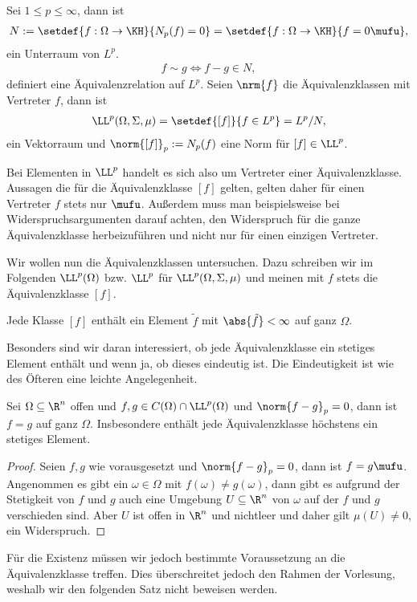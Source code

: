 \begin{defn}
\label{defn:3.69}
Sei $1\le p\le\infty$, dann ist
\begin{align*}
N := \setdef{f: \Omega\to\KH}{N_p(f) =0} = \setdef{f:\Omega\to\KH}{f=0\mufu},
\end{align*}
ein Unterraum von $L^p$.
\begin{align*}
f\sim g \Leftrightarrow f-g\in N,
\end{align*}
definiert eine Äquivalenzrelation auf $L^p$. Seien $\nrm{f}$ die
Äquivalenzklassen mit Vertreter $f$, dann ist
\begin{align*}
\LL^p(\Omega,\Sigma,\mu) = \setdef{[f]}{f\in L^p} = L^p/N,
\end{align*}
ein Vektorraum und $\norm{[f]}_p := N_p(f)$ eine Norm für
$[f]\in\LL^p$.\fishhere
\end{defn}

Bei Elementen in $\LL^p$ handelt es sich also um Vertreter einer
Äquivalenzklasse. Aussagen die für die Äquivalenzklasse $[f]$ gelten, gelten
daher für einen Vertreter $f$ stets nur $\mufu$. Außerdem muss man
beispielsweise bei Widerspruchsargumenten darauf achten, den Widerspruch für die ganze
Äquivalenzklasse herbeizuführen und nicht nur für einen einzigen Vertreter.

Wir wollen nun die Äquivalenzklassen untersuchen. Dazu schreiben wir im Folgenden $\LL^p(\Omega)$ bzw. $\LL^p$ für
$\LL^p(\Omega,\Sigma,\mu)$ und meinen mit $f$ stets die Äquivalenzklasse $[f]$.

\begin{bemn}
Jede Klasse $[f]$ enthält ein Element $\tilde{f}$ mit $\abs{\tilde{f}} <\infty$
auf ganz $\Omega$.\maphere
\end{bemn}
Besonders sind wir daran interessiert, ob jede Äquivalenzklasse ein
stetiges Element enthält und wenn ja, ob dieses eindeutig ist. Die
Eindeutigkeit ist wie des Öfteren eine leichte Angelegenheit.

\begin{prop}
\label{prop:3.70}
Sei $\Omega\subseteq\R^n$ offen und $f,g\in C(\Omega)\cap\LL^p(\Omega)$ und
$\norm{f-g}_p=0$, dann ist $f=g$ auf ganz $\Omega$. Insbesondere enthält jede
Äquivalenzklasse höchstens ein stetiges Element.\fishhere
\end{prop}

\begin{proof}
Seien $f,g$ wie vorausgesetzt und $\norm{f-g}_p=0$, dann ist $f=g\mufu$.
Angenommen es gibt ein $\omega\in\Omega$ mit $f(\omega) \neq g(\omega)$, dann
gibt es aufgrund der Stetigkeit von $f$ und $g$ auch eine Umgebung
$U\subseteq\R^n$ von $\omega$ auf der $f$ und $g$ verschieden sind. Aber $U$
ist offen in $\R^n$ und nichtleer und daher gilt $\mu(U)\neq 0$, ein Widerspruch.\qedhere
\end{proof}
Für die Existenz müssen wir jedoch bestimmte Voraussetzung an die
Äquivalenzklasse treffen. Dies überschreitet jedoch den Rahmen der Vorlesung,
weshalb wir den folgenden Satz nicht beweisen werden.

